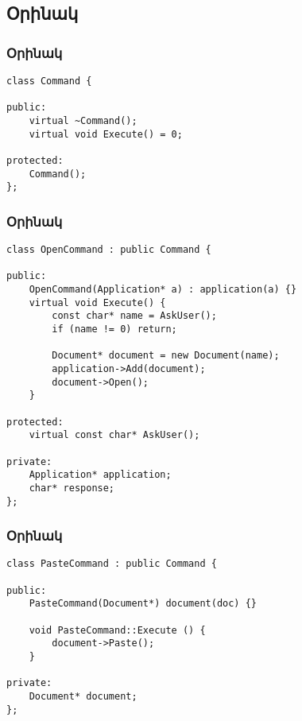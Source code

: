 \documentclass{beamer}
\begin{document}
\subsection{Օրինակ}
\begin{frame}[fragile]\frametitle{Օրինակ}
\begin{english}
\begin{verbatim}
class Command {

public:
    virtual ~Command();
    virtual void Execute() = 0;

protected:
    Command();
};
\end{verbatim}
\end{english}
\end{frame}

\begin{frame}[fragile]\frametitle{Օրինակ}
\begin{english}
\begin{verbatim}
class OpenCommand : public Command {

public:
    OpenCommand(Application* a) : application(a) {}
    virtual void Execute() {
        const char* name = AskUser();
        if (name != 0) return;

        Document* document = new Document(name);
        application->Add(document);
        document->Open();
    }

protected:
    virtual const char* AskUser();

private:
    Application* application;
    char* response;
};
\end{verbatim}
\end{english}
\end{frame}

\begin{frame}[fragile]\frametitle{Օրինակ}
\begin{english}
\begin{verbatim}
class PasteCommand : public Command {

public:
    PasteCommand(Document*) document(doc) {}

    void PasteCommand::Execute () {
        document->Paste();
    }

private:
    Document* document;
};
\end{verbatim}
\end{english}
\end{frame}
\end{document}
